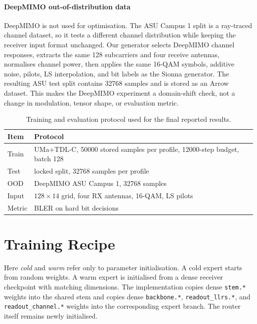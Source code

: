 \paragraph{DeepMIMO out-of-distribution data}
DeepMIMO is not used for optimisation. The ASU Campus 1 split is a ray-traced channel dataset, so it tests a different channel distribution while keeping the receiver input format unchanged. Our generator selects DeepMIMO channel responses, extracts the same \num{128} subcarriers and four receive antennas, normalises channel power, then applies the same 16-QAM symbols, additive noise, pilots, LS interpolation, and bit labels as the Sionna generator. The resulting ASU test split contains \num{32768} samples and is stored as an Arrow dataset. This makes the DeepMIMO experiment a domain-shift check, not a change in modulation, tensor shape, or evaluation metric.

\begin{table}[h]
\centering
\small
\setlength{\tabcolsep}{7pt}
\begin{tabular}{l l}
\toprule
Item & Protocol \\
\midrule
Train & UMa+TDL-C, \num{50000} stored samples per profile, \num{12000}-step budget, batch \num{128} \\
Test & locked split, \num{32768} samples per profile \\
OOD & DeepMIMO ASU Campus 1, \num{32768} samples \\
Input & $128 \times 14$ grid, four RX antennas, 16-QAM, LS pilots \\
Metric & BLER on hard bit decisions \\
\bottomrule
\end{tabular}
\caption{Training and evaluation protocol used for the final reported results.}
\label{tab:protocol}
\end{table}

\section{Training Recipe}
\label{sec:recipe}

Here \emph{cold} and \emph{warm} refer only to parameter initialisation. A cold expert starts from random weights. A warm expert is initialised from a dense receiver checkpoint with matching dimensions. The implementation copies dense \texttt{stem.*} weights into the shared stem and copies dense \texttt{backbone.*}, \texttt{readout\_llrs.*}, and \texttt{readout\_channel.*} weights into the corresponding expert branch. The router itself remains newly initialised.

